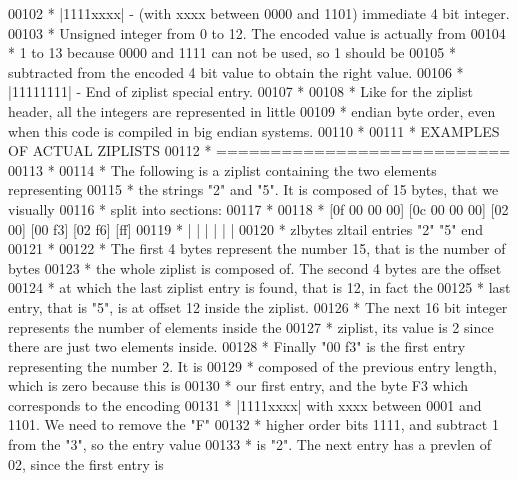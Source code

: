 \begin{DoxyCode}
00102 \textcolor{comment}{ * |1111xxxx| - (with xxxx between 0000 and 1101) immediate 4 bit integer.}
00103 \textcolor{comment}{ *      Unsigned integer from 0 to 12. The encoded value is actually from}
00104 \textcolor{comment}{ *      1 to 13 because 0000 and 1111 can not be used, so 1 should be}
00105 \textcolor{comment}{ *      subtracted from the encoded 4 bit value to obtain the right value.}
00106 \textcolor{comment}{ * |11111111| - End of ziplist special entry.}
00107 \textcolor{comment}{ *}
00108 \textcolor{comment}{ * Like for the ziplist header, all the integers are represented in little}
00109 \textcolor{comment}{ * endian byte order, even when this code is compiled in big endian systems.}
00110 \textcolor{comment}{ *}
00111 \textcolor{comment}{ * EXAMPLES OF ACTUAL ZIPLISTS}
00112 \textcolor{comment}{ * ===========================}
00113 \textcolor{comment}{ *}
00114 \textcolor{comment}{ * The following is a ziplist containing the two elements representing}
00115 \textcolor{comment}{ * the strings "2" and "5". It is composed of 15 bytes, that we visually}
00116 \textcolor{comment}{ * split into sections:}
00117 \textcolor{comment}{ *}
00118 \textcolor{comment}{ *  [0f 00 00 00] [0c 00 00 00] [02 00] [00 f3] [02 f6] [ff]}
00119 \textcolor{comment}{ *        |             |          |       |       |     |}
00120 \textcolor{comment}{ *     zlbytes        zltail    entries   "2"     "5"   end}
00121 \textcolor{comment}{ *}
00122 \textcolor{comment}{ * The first 4 bytes represent the number 15, that is the number of bytes}
00123 \textcolor{comment}{ * the whole ziplist is composed of. The second 4 bytes are the offset}
00124 \textcolor{comment}{ * at which the last ziplist entry is found, that is 12, in fact the}
00125 \textcolor{comment}{ * last entry, that is "5", is at offset 12 inside the ziplist.}
00126 \textcolor{comment}{ * The next 16 bit integer represents the number of elements inside the}
00127 \textcolor{comment}{ * ziplist, its value is 2 since there are just two elements inside.}
00128 \textcolor{comment}{ * Finally "00 f3" is the first entry representing the number 2. It is}
00129 \textcolor{comment}{ * composed of the previous entry length, which is zero because this is}
00130 \textcolor{comment}{ * our first entry, and the byte F3 which corresponds to the encoding}
00131 \textcolor{comment}{ * |1111xxxx| with xxxx between 0001 and 1101. We need to remove the "F"}
00132 \textcolor{comment}{ * higher order bits 1111, and subtract 1 from the "3", so the entry value}
00133 \textcolor{comment}{ * is "2". The next entry has a prevlen of 02, since the first entry is}

\end{DoxyCode}
